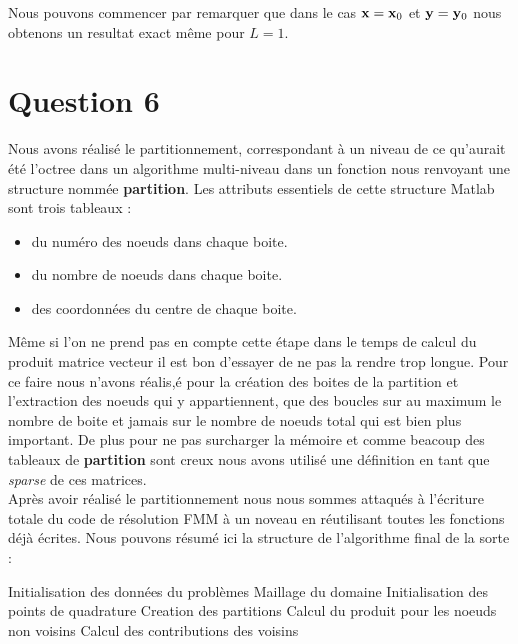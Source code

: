 \documentclass[10pt]{article}
\begin{document}
\begin{multicols}{2}

Nous pouvons commencer par remarquer que dans le cas ${\bf x}={\bf x}_0$ et ${\bf y}={\bf y}_0$ nous obtenons un resultat exact même pour $L=1$.  

\vspace*{22pt}


\section*{Question 6}

Nous avons réalisé le partitionnement, correspondant à un niveau de ce qu'aurait été l'octree dans un algorithme multi-niveau dans un fonction nous renvoyant une structure nommée \textbf{partition}. Les attributs essentiels de cette structure Matlab sont trois tableaux : \\

\begin{itemize}
\item du numéro des noeuds dans chaque boite. 
\item du nombre de noeuds dans chaque boite.
\item des coordonnées du centre de chaque boite. 
\end{itemize}

\vspace*{10pt}
Même si l'on ne prend pas en compte cette étape dans le temps de calcul du produit matrice vecteur il est bon d'essayer de ne pas la rendre trop longue. Pour ce faire nous n'avons réalis,é pour la création des boites de la partition et l'extraction des noeuds qui y appartiennent, que des boucles sur au maximum le nombre de boite et jamais sur le nombre de noeuds total qui est bien plus important. De plus pour ne pas surcharger la mémoire et comme beacoup des tableaux de \textbf{partition} sont creux nous avons utilisé une définition en tant que \textit{sparse} de ces matrices. \\


Après avoir réalisé le partitionnement nous nous sommes attaqués à l'écriture totale du code de résolution FMM à un noveau en réutilisant toutes les fonctions déjà écrites. Nous pouvons résumé ici la structure de l'algorithme final de la sorte : 

\begin{algorithm}[H]
	\begin{algorithmic}[1]
		\State Initialisation des données du problèmes
        \State Maillage du domaine
        \State Initialisation des points de quadrature
        \State Creation des partitions
        \State Calcul du produit pour les noeuds non voisins
        \State Calcul des contributions des voisins
	\end{algorithmic}
\end{algorithm}
    

\end{multicols}
\end{document}
